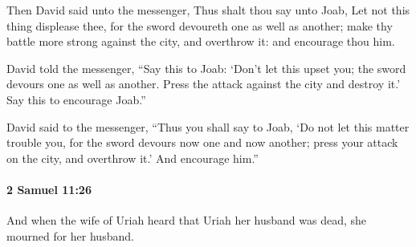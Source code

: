 			\begin{versebox}
					\item[BHS] 
					\item[ASV] Then David said unto the messenger, Thus shalt thou say unto Joab, Let not this thing displease thee, for the sword devoureth one as well as another; make thy battle more strong against the city, and overthrow it: and encourage thou him.
					\item[NIV] David told the messenger, “Say this to Joab: ‘Don’t let this upset you; the sword devours one as well as another. Press the attack against the city and destroy it.’ Say this to encourage Joab.”
					\item[NRSV] David said to the messenger, “Thus you shall say to Joab, ‘Do not let this matter trouble you, for the sword devours now one and now another; press your attack on the city, and overthrow it.’ And encourage him.”
			\end{versebox}

		\paragraph{2 Samuel 11:26} %
			\label{2SAMUEL-11-26}

			And when the wife of Uriah heard that Uriah her husband was dead, she mourned for her husband.

